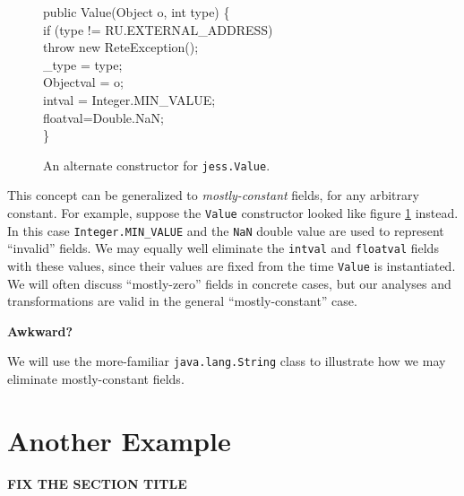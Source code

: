 \documentclass[preprint]{acmconf}
\begin{document}
\begin{figure}
\begin{samplecode}
public Value(Object o, int type) \{\\
\>if (type != RU.EXTERNAL\_ADDRESS)\\
\>\>throw new ReteException();\\
\>\_type = type;\\
\>Objectval = o;\\
\>intval = Integer.MIN\_VALUE;\\
\>floatval=Double.NaN;\\
\}\\
\end{samplecode}
\caption{An alternate constructor for {\tt jess.Value}.}
\label{fig:alt-constructor}
\end{figure}

This concept can be generalized to {\it mostly-constant} fields,
for any arbitrary constant.  For example, suppose the {\tt Value}
constructor looked like figure \ref{fig:alt-constructor} instead.
In this case {\tt Integer.MIN\_VALUE} and the {\tt NaN} double value
are used to represent ``invalid'' fields.  We may equally well
eliminate the {\tt intval} and {\tt floatval} fields with these
values, since their values are fixed from the time {\tt Value} is
instantiated.
We will often discuss ``mostly-zero'' fields in concrete cases, but
our analyses and transformations are valid in the general
``mostly-constant'' case.

{\bf Awkward?}

We will use the more-familiar {\tt java.lang.String} class to
illustrate how we may eliminate mostly-constant fields.

\section{Another Example}
{\bf FIX THE SECTION TITLE}

\end{document}
